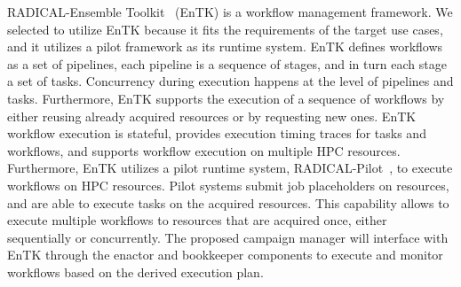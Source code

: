 RADICAL-Ensemble Toolkit~\cite{balasubramanian2018harnessing} (EnTK) is a workflow management framework.
We selected to utilize EnTK because it fits the requirements of the target use cases, and it utilizes a pilot framework as its runtime system.
EnTK defines workflows as a set of pipelines, each pipeline is a sequence of stages, and in turn each stage a set of tasks.
Concurrency during execution happens at the level of pipelines and tasks.
Furthermore, EnTK supports the execution of a sequence of workflows by either reusing already acquired resources or by requesting new ones.
EnTK workflow execution is stateful, provides execution timing traces for tasks and workflows, and supports workflow execution on multiple HPC resources.
Furthermore, EnTK utilizes a pilot runtime system, RADICAL-Pilot~\cite{merzky2019using}, to execute workflows on HPC resources.
Pilot systems submit job placeholders on resources, and are able to execute tasks on the acquired resources.
This capability allows to execute multiple workflows to resources that are acquired once, either sequentially or concurrently.
The proposed campaign manager will interface with EnTK through the enactor and bookkeeper components to execute and monitor workflows based on the derived execution plan.

